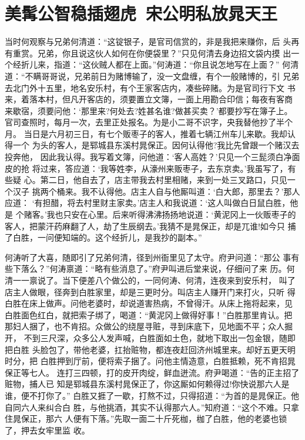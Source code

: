 \chapter{美髯公智稳插翅虎~宋公明私放晁天王}

当时何观察与兄弟何清道：“这锭银子，是官司信赏的，非是我把来赚你，后
头再有重赏。兄弟，你且说这伙人如何在你便袋里？”只见何清去身边招文袋内摸
出一个经折儿来，指道：“这伙贼人都在上面。”何涛道：“你且说怎地写在上面？”
何清道：“不瞒哥哥说，兄弟前日为赌博输了，没一文盘缠，有个一般赌博的，引
兄弟去北门外十五里，地名安乐村，有个王家客店内，凑些碎赌。为是官司行下文
书来，着落本村，但凡开客店的，须要置立文簿，一面上用勘合印信；每夜有客商
来歇宿，须要问他：‘那里来?何处去?姓甚名谁?做甚买卖？’都要抄写在簿子上。
官司查照时，每月一次，去里正处报名。为是小二哥不识字，央我替他抄了半个月。
当日是六月初三日，有七个贩枣子的客人，推着七辆江州车儿来歇。我却认得一个
为头的客人，是郓城县东溪村晁保正。因何认得他?我比先曾跟一个赌汉去投奔他，
因此我认得。我写着文簿，问他道：‘客人高姓？’只见一个三髭须白净面皮的抢
将过来，答应道：‘我等姓李，从濠州来贩枣子，去东京卖。’我虽写了，有些疑
心。第二日，他自去了，店主带我去村里相赌，来到一处三叉路口，只见一个汉子
挑两个桶来。我不认得他。店主人自与他厮叫道：‘白大郎，那里去？’那人应道：
‘有担醋，将去村里财主家卖。’店主人和我说道：‘这人叫做白日鼠白胜，他是
个赌客。’我也只安在心里。后来听得沸沸扬扬地说道：‘黄泥冈上一伙贩枣子的
客人，把蒙汗药麻翻了人，劫了生辰纲去。’我猜不是晁保正，却是兀谁!如今只
捕了白胜，一问便知端的。这个经折儿，是我抄的副本。”

何涛听了大喜，随即引了兄弟何清，径到州衙里见了太守。府尹问道：“那公
事有些下落么？”何涛禀道：“略有些消息了。”府尹叫进后堂来说，仔细问了来
历。何清一一禀说了。当下便差八个做公的，一同何涛、何清，连夜来到安乐村，
叫了店主人做眼，径奔到白胜家里，却是三更时分。叫店主人赚开门来打火，只听
得白胜在床上做声。问他老婆时，却说道害热病，不曾得汗。从床上拖将起来，见
白胜面色红白，就把索子绑了，喝道：“黄泥冈上做得好事！”白胜那里肯认。把
那妇人捆了，也不肯招。众做公的绕屋寻赃，寻到床底下，见地面不平；众人掘开，
不到三尺深，众多公人发声喊，白胜面如土色，就地下取出一包金银，随即把白胜
头脸包了，带他老婆，扛抬赃物，都连夜赶回济州城里来。却好五更天明时分，把
白胜押到厅前，便将索子捆了。问他主情造意，白胜抵赖，死不肯招晁保正等七人。
连打三四顿，打的皮开肉绽，鲜血迸流。府尹喝道：“告的正主招了赃物，捕人已
知是郓城县东溪村晁保正了，你这厮如何赖得过!你快说那六人是谁，便不打你了。”
白胜又捱了一歇，打熬不过，只得招道：“为首的是晁保正。他自同六人来纠合白
胜，与他挑酒，其实不认得那六人。”知府道：“这个不难。只拿住晁保正，那六
人便有下落。”先取一面二十斤死枷，枷了白胜，他的老婆也锁了，押去女牢里监
收。

